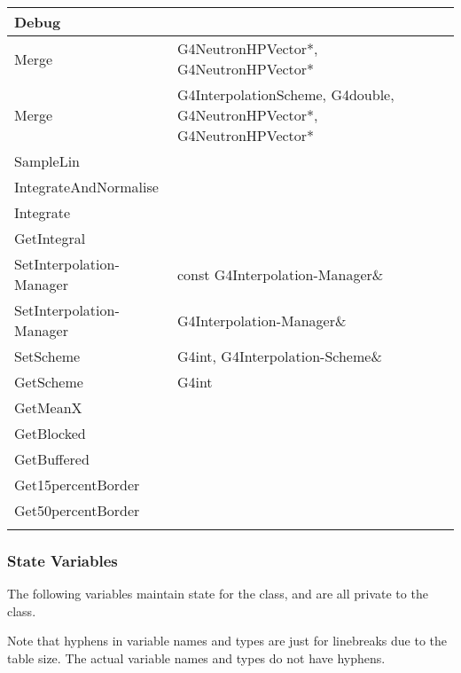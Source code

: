 \documentclass[12pt]{article}
\begin{document}
\begin{longtable}{p{}p{}p{}}
Debug & & \\\hline
Merge & G4NeutronHPVector*,  G4NeutronHPVector* & \\\hline
Merge & G4InterpolationScheme, G4double, G4NeutronHPVector*, G4NeutronHPVector* &\\\hline
SampleLin & & \\\hline
IntegrateAndNormalise & & \\\hline
Integrate & & \\\hline
GetIntegral & & \\\hline
SetInterpolation-Manager & const G4Interpolation-Manager\& &\\\hline
SetInterpolation-Manager & G4Interpolation-Manager\& & \\\hline
SetScheme & G4int, G4Interpolation-Scheme\& & \\\hline
GetScheme & G4int & \\\hline
GetMeanX & & \\\hline
GetBlocked & & \\\hline
GetBuffered & & \\\hline
Get15percentBorder & &  \\\hline
Get50percentBorder & &  \\
\arrayrulecolor{black}
\bottomrule
\end{longtable}

\subsubsection{State Variables}%
The following variables maintain state for the class, and are all private to the class.

Note that hyphens in variable names and types are just for linebreaks due to the table size. The actual variable names and types do not have hyphens.
\end{document}
